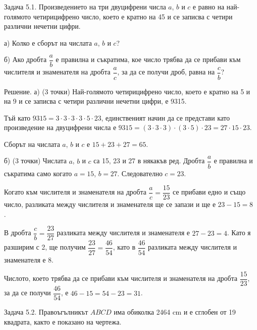 
Задача 5.1. Произведението на три двуцифрени числа $a$, $b$ и $c$ е равно на най-голямото четирицифрено число, което е кратно на 45 и се записва с четири различни нечетни цифри.

а) Колко е сборът на числата $a$, $b$ и $c$?

б) Ако дробта $\dfrac ab$ е правилна и съкратима, кое число трябва да се прибави към числителя и знаменателя на дробта $\dfrac ac$, за да се получи дроб, равна на $\dfrac cb$?

Решение. а) (3 точки) Най-голямото четирицифрено число, което е кратно на 5 и на 9 и се записва с четири различни нечетни цифри, е 9315.

Тъй като $9315=3\cdot3\cdot3\cdot3\cdot5\cdot23$, единственият начин да се представи като произведение на двуцифрени числа е $9315=(3\cdot3\cdot3)\cdot(3\cdot5)\cdot23=27\cdot15\cdot23$.

Сборът на числата $a$, $b$ и $c$ е $15+23+27=65$.

б) (3 точки) Числата $a$, $b$ и $c$ са 15, 23 и 27 в някакъв ред. Дробта $\dfrac ab$ е правилна и съкратима само когато $a=15$, $b=27$. Следователно $c=23$.

Когато към числителя и знаменателя на дробта $\dfrac ac=\dfrac{15}{23}$ се прибави едно и също число, разликата между числителя и знаменателя ще се запази и ще е $23-15=8$.

В дробта $\dfrac cb=\dfrac{23}{27}$ разликата между числителя и знаменателя е $27-23=4$. Като я разширим с 2, ще получим $\dfrac{23}{27}=\dfrac{46}{54}$, като в $\dfrac{46}{54}$ разликата между числителя и знаменателя е 8.

Числото, което трябва да се прибави към числителя и знаменателя на дробта $\dfrac{15}{23}$, за да се получи $\dfrac{46}{54}$, е $46-15=54-23=31$.

Задача 5.2. Правоъгълникът $ABCD$ има обиколка 2464 cm и е сглобен от 19 квадрата, както е показано на чертежа.

